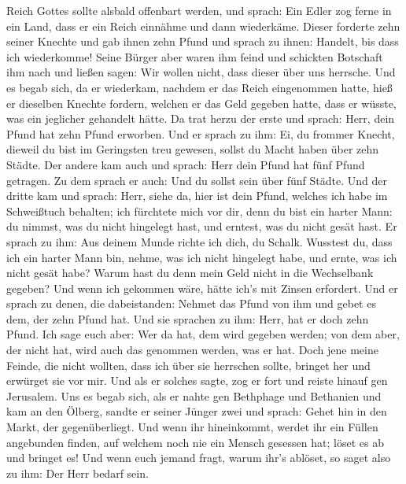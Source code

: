 Reich Gottes sollte alsbald offenbart werden,  und sprach:
Ein Edler zog ferne in ein Land, dass er ein Reich einnähme und dann
wiederkäme.  Dieser forderte zehn seiner Knechte und gab
ihnen zehn Pfund und sprach zu ihnen: Handelt, bis dass ich wiederkomme!
 Seine Bürger aber waren ihm feind und schickten Botschaft
ihm nach und ließen sagen: Wir wollen nicht, dass dieser über uns
herrsche.  Und es begab sich, da er wiederkam, nachdem er
das Reich eingenommen hatte, hieß er dieselben Knechte fordern, welchen
er das Geld gegeben hatte, dass er wüsste, was ein jeglicher gehandelt
hätte.  Da trat herzu der erste und sprach: Herr, dein
Pfund hat zehn Pfund erworben.  Und er sprach zu ihm: Ei,
du frommer Knecht, dieweil du bist im Geringsten treu gewesen, sollst du
Macht haben über zehn Städte.  Der andere kam auch und
sprach: Herr dein Pfund hat fünf Pfund getragen.  Zu dem
sprach er auch: Und du sollst sein über fünf Städte.  Und
der dritte kam und sprach: Herr, siehe da, hier ist dein Pfund, welches
ich habe im Schweißtuch behalten;  ich fürchtete mich vor
dir, denn du bist ein harter Mann: du nimmst, was du nicht hingelegt
hast, und erntest, was du nicht gesät hast.  Er sprach zu
ihm: Aus deinem Munde richte ich dich, du Schalk. Wusstest du, dass ich
ein harter Mann bin, nehme, was ich nicht hingelegt habe, und ernte, was
ich nicht gesät habe?  Warum hast du denn mein Geld nicht
in die Wechselbank gegeben? Und wenn ich gekommen wäre, hätte ich's mit
Zinsen erfordert.  Und er sprach zu denen, die
dabeistanden: Nehmet das Pfund von ihm und gebet es dem, der zehn Pfund
hat.  Und sie sprachen zu ihm: Herr, hat er doch zehn
Pfund.  Ich sage euch aber: Wer da hat, dem wird gegeben
werden; von dem aber, der nicht hat, wird auch das genommen werden, was
er hat.  Doch jene meine Feinde, die nicht wollten, dass
ich über sie herrschen sollte, bringet her und erwürget sie vor mir.
 Und als er solches sagte, zog er fort und reiste hinauf
gen Jerusalem.  Uns es begab sich, als er nahte gen
Bethphage und Bethanien und kam an den Ölberg, sandte er seiner Jünger
zwei  und sprach: Gehet hin in den Markt, der
gegenüberliegt. Und wenn ihr hineinkommt, werdet ihr ein Füllen
angebunden finden, auf welchem noch nie ein Mensch gesessen hat; löset
es ab und bringet es!  Und wenn euch jemand fragt, warum
ihr's ablöset, so saget also zu ihm: Der Herr bedarf sein. 
